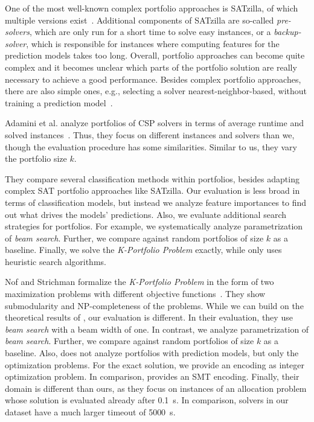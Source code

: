 \documentclass[conference]{IEEEtran}
\begin{document}
One of the most well-known complex portfolio approaches is SATzilla, of which multiple versions exist~\cite{xu2008satzilla, xu2012satzilla2012}. 
Additional components of SATzilla are so-called \emph{pre-solvers}, which are only run for a short time to solve easy instances, or a \emph{backup-solver}, which is responsible for instances where computing features for the prediction models takes too long. 
Overall, portfolio approaches can become quite complex and it becomes unclear which parts of the portfolio solution are really necessary to achieve a good performance.
Besides complex portfolio approaches, there are also simple ones, e.g., selecting a solver nearest-neighbor-based, without training a prediction model~\cite{malitsky2011non, nikolic2013simple, samulowitz2013snappy}.

Adamini et al. analyze portfolios of CSP solvers in terms of average runtime and solved instances~\cite{amadini2014empirical, amadini2016extensive}. 
Thus, they focus on different instances and solvers than we, though the evaluation procedure has some similarities.
Similar to us, they vary the portfolio size $k$.

They compare several classification methods within portfolios, besides adapting complex SAT portfolio approaches like SATzilla.
Our evaluation is less broad in terms of classification models, but instead we analyze feature importances to find out what drives the models' predictions.
Also, we evaluate additional search strategies for portfolios.
For example, we systematically analyze parametrization of \emph{beam search}.
Further, we compare against random portfolios of size $k$ as a baseline.
Finally, we solve the \emph{K-Portfolio Problem} exactly, while \cite{amadini2014empirical} only uses heuristic search algorithms.

Nof and Strichman formalize the \emph{K-Portfolio Problem} in the form of two maximization problems with different objective functions~\cite{nof2020real}.
They show submodularity and NP-completeness of the problems.
While we can build on the theoretical results of \cite{nof2020real}, our evaluation is different.
In their evaluation, they use \emph{beam search} with a beam width of one.
In contrast, we analyze parametrization of \emph{beam search}.
Further, we compare against random portfolios of size $k$ as a baseline.
Also, \cite{nof2020real} does not analyze portfolios with prediction models, but only the optimization problems.
For the exact solution, we provide an encoding as integer optimization problem.
In comparison, \cite{nof2020real} provides an SMT encoding.
Finally, their domain is different than ours, as they focus on instances of an allocation problem whose solution is evaluated already after 0.1~s.
In comparison, solvers in our dataset have a much larger timeout of 5000~s.
\end{document}
